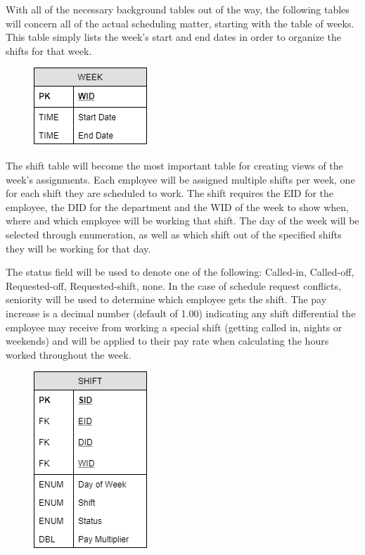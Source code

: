 \documentclass[letter,12pt]{texMemo}
\begin{document}
\newpage
With all of the necessary background tables out of the way, the following tables will concern all of the actual scheduling matter, starting with the table of weeks. This table simply lists the week's start and end dates in order to organize the shifts for that week.
\begin{figure}[H]
	\centering
	\includegraphics[scale=.6]{week.png}
\end{figure}

The shift table will become the most important table for creating views of the week's assignments. Each employee will be assigned multiple shifts per week, one for each shift they are scheduled to work. The shift requires the EID for the employee, the DID for the department and the WID of the week to show when, where and which employee will be working that shift. The day of the week will be selected through enumeration, as well as which shift out of the specified shifts they will be working for that day.

The status field will be used to denote one of the following: Called-in, Called-off, Requested-off, Requested-shift, none. In the case of schedule request conflicts, seniority will be used to determine which employee gets the shift. The pay increase is a decimal number (default of 1.00) indicating any shift differential the employee may receive from working a special shift (getting called in, nights or weekends) and will be applied to their pay rate when calculating the hours worked throughout the week.
\begin{figure}[H]
	\centering
	\includegraphics[scale=.6]{shift.png}
\end{figure}
\end{document}

